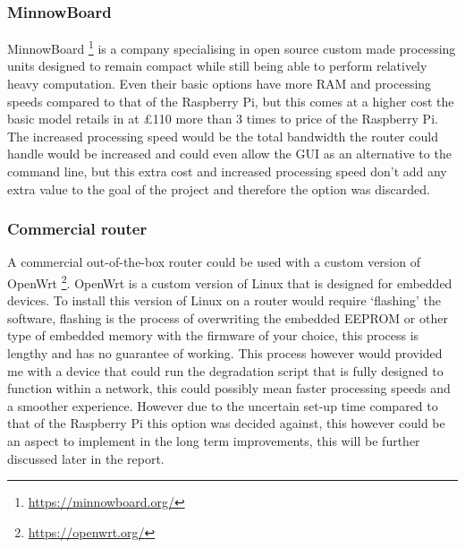 \subsubsection*{MinnowBoard}
MinnowBoard \footnote{\url{https://minnowboard.org/}} is a company specialising in open source custom made processing units designed to remain compact while still being able to perform relatively heavy computation. Even their basic options have more RAM and processing speeds compared to that of the Raspberry Pi, but this comes at a higher cost the basic model retails in at £110 more than 3 times to price of the Raspberry Pi. The increased processing speed would be the total bandwidth the router could handle would be increased and could even allow the GUI as an alternative to the command line, but this extra cost and increased processing speed don't add any extra value to the goal of the project and therefore the option was discarded.

\subsubsection*{Commercial router}
A commercial out-of-the-box router could be used with a custom version of OpenWrt \footnote{\url{https://openwrt.org/}}. OpenWrt is a custom version of Linux that is designed for embedded devices. To install this version of Linux on a router would require `flashing' the software, flashing is the process of overwriting the embedded EEPROM or other type of embedded memory with the firmware of your choice, this process is lengthy and has no guarantee of working. This process however would provided me with a device that could run the degradation script that is fully designed to function within a network, this could possibly mean faster processing speeds and a smoother experience. However due to the uncertain set-up time compared to that of the Raspberry Pi this option was decided against, this however could be an aspect to implement in the long term improvements, this will be further discussed later in the report.


